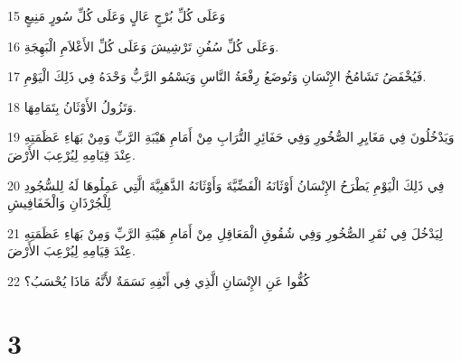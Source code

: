 \par 15 وَعَلَى كُلِّ بُرْجٍ عَالٍ وَعَلَى كُلِّ سُورٍ مَنِيعٍ
\par 16 وَعَلَى كُلِّ سُفُنِ تَرْشِيشَ وَعَلَى كُلِّ الأَعْلاَمِ الْبَهِجَةِ.
\par 17 فَيُخْفَضُ تَشَامُخُ الإِنْسَانِ وَتُوضَعُ رِفْعَةُ النَّاسِ وَيَسْمُو الرَّبُّ وَحْدَهُ فِي ذَلِكَ الْيَوْمِ.
\par 18 وَتَزُولُ الأَوْثَانُ بِتَمَامِهَا.
\par 19 وَيَدْخُلُونَ فِي مَغَايِرِ الصُّخُورِ وَفِي حَفَائِرِ التُّرَابِ مِنْ أَمَامِ هَيْبَةِ الرَّبِّ وَمِنْ بَهَاءِ عَظَمَتِهِ عِنْدَ قِيَامِهِ لِيُرْعِبَ الأَرْضَ.
\par 20 فِي ذَلِكَ الْيَوْمِ يَطْرَحُ الإِنْسَانُ أَوْثَانَهُ الْفَضِّيَّةَ وَأَوْثَانَهُ الذَّهَبِيَّةَ الَّتِي عَمِلُوهَا لَهُ لِلسُّجُودِ لِلْجُرْذَانِ وَالْخَفَافِيشِ
\par 21 لِيَدْخُلَ فِي نُقَرِ الصُّخُورِ وَفِي شُقُوقِ الْمَعَاقِلِ مِنْ أَمَامِ هَيْبَةِ الرَّبِّ وَمِنْ بَهَاءِ عَظَمَتِهِ عِنْدَ قِيَامِهِ لِيُرْعِبَ الأَرْضَ.
\par 22 كُفُّوا عَنِ الإِنْسَانِ الَّذِي فِي أَنْفِهِ نَسَمَةٌ لأَنَّهُ مَاذَا يُحْسَبُ؟

\chapter{3}

